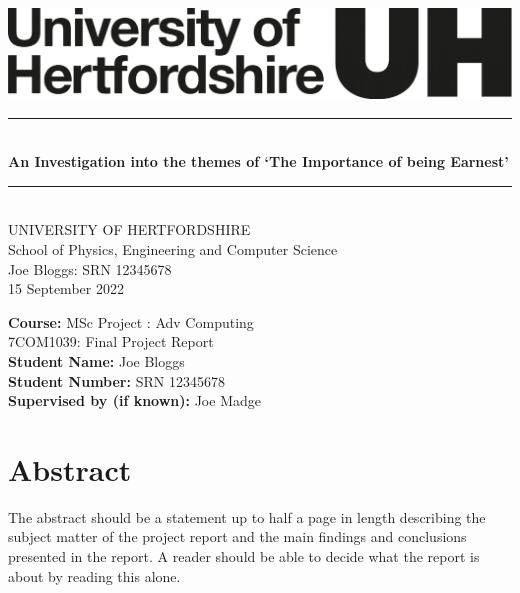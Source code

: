 \documentclass[a4paper, notitlepage, 11pt]{article}
\newcommand{\projecttitle}{An Investigation into the themes of `The Importance of being Earnest'}
\newcommand{\studentname}{Joe Bloggs}
\newcommand{\studentnumber}{SRN 12345678}
\newcommand{\supervisorname}{Joe Madge}
\newcommand{\HRule}{\rule{\linewidth}{0.5mm}}
\newcommand{\doctype}{Final Project Report}
\newcommand{\coursecode}{7COM1039}
\newcommand{\coursedescr}{MSc Project : Adv Computing}
\newcommand{\reportdate}{15 September 2022}
\begin{document}
\thispagestyle{empty} %
\begin{center}
    \vspace{2cm}
    \includegraphics[scale=0.2]{herts-logo-black.png} \\[5cm]
    
    \HRule \\[0.4cm]
    \huge{ \bfseries \projecttitle \\[0.15cm] }
    \HRule \\[1.5cm]
    
    \textsf{\LARGE{UNIVERSITY OF HERTFORDSHIRE\\
    School of Physics, Engineering and Computer Science} \\[2cm]}
    \LARGE{\studentname \enspace : \enspace \studentnumber}\\
    \large{\reportdate } \\[3cm]
    
\end{center}

\large{\textbf{Course: }\coursedescr\\
        \coursecode \enspace : \enspace \doctype \\
    \textbf{Student Name:} \studentname \\
    \textbf{Student Number:} \studentnumber \\
    \textbf{Supervised by (if known):} \supervisorname 
}



\clearpage
\setcounter{page}{1}
\setcounter{tocdepth}{2}

\section*{Abstract}
The abstract should be a statement up to half a page in length describing the subject matter of 
the  project  report  and  the  main  findings  and  conclusions  presented  in  the  report.  A  reader should be able to decide what the report is about by reading this alone.  
\end{document}
